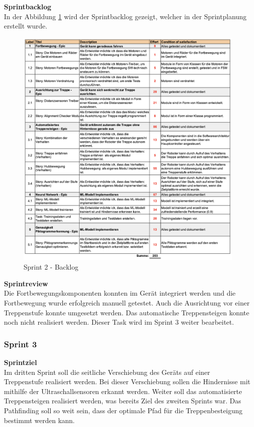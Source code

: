 \textbf{Sprintbacklog}\\
In der Abbildung \ref{fig:sprint-backlog-2} wird der Sprintbacklog gezeigt, welcher in der Sprintplanung erstellt wurde.
\begin{figure}[H]
  \includegraphics[width=1.0\textwidth]{img/projektmanagement/Sprint 2.png}
  \centering
  \caption{Sprint 2 - Backlog}
  \label{fig:sprint-backlog-2}
\end{figure}

\textbf{Sprintreview}\\
Die Fortbewegungskomponenten konnten im Gerät integriert werden und die Fortbewegung wurde erfolgreich manuell getestet. Auch die Ausrichtung vor einer Treppenstufe konnte umgesetzt werden. Das automatische Treppensteigen konnte noch nicht realisiert werden. Dieser Task wird im Sprint 3 weiter bearbeitet.


\subsubsection{Sprint 3}
\textbf{Sprintziel}\\
Im dritten Sprint soll die seitliche Verschiebung des Geräts auf einer Treppenstufe realisiert werden. Bei dieser Verschiebung sollen die Hindernisse mit mithilfe der Ultraschallsensoren erkannt werden. Weiter soll das automatisierte Treppensteigen realisiert werden, was bereits Ziel des zweiten Sprints war. Das Pathfinding soll so weit sein, dass der optimale Pfad für die Treppenbesteigung bestimmt werden kann.

